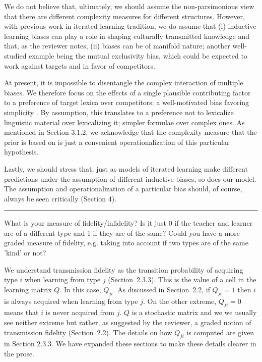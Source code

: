 \documentclass[12pt,a4paper]{article}
\begin{document}
We do not believe that, ultimately, we should assume the non-parsimonious view that there are different complexity measures for different structures. However, with previous work in iterated learning tradition, we do assume that (i) inductive learning biases can play a role in shaping culturally transmitted knowledge and that, as the reviewer notes, (ii) biases can be of manifold nature; another well-studied example being the mutual exclusivity bias, which could be expected to work against targets and in favor of competitors.

At present, it is impossible to disentangle the complex interaction of multiple biases. We therefore focus on the effects of a single plausible contributing factor to a preference of target lexica over competitors: a well-motivated bias favoring simplicity \citep{feldman:2000,chater+vitanyi:2003, piantadosi+etal:2012a,kirby+etal:2015,piantadosi+etal:underreview}. By assumption, this translates to a preference not to lexicalize linguistic material over lexicalizing it; simpler formulae over complex ones. As mentioned in Section 3.1.2, we acknowledge that the complexity measure that the prior is based on  is just a convenient operationalization of this particular hypothesis. 

Lastly, we should stress that, just as models of iterated learning make different predictions under the assumption of different inductive biases, so does our model. The assumption and operationalization of a particular bias should, of course, always be seen critically (Section 4). 

%

\vspace{0.5cm}
\noindent\rule{\textwidth}{1pt}

\begin{mdframed}[backgroundcolor=gray!25,linecolor=gray!25,frametitle= Reviewer \thereviewerCounter~comment \thereviewerCommentCounter \hfill ~~({\it transmission fidelity})]
%
What is your measure of fidelity/infidelity? Is it just 0 if the teacher and learner are of a different type and 1 if they are of the same? Could you have a more graded measure of fidelity, e.g. taking into account if two types are of the same 'kind' or not? 
\end{mdframed}
%
We understand transmission fidelity as the transition probability of acquiring type $i$ when learning from type $j$ (Section~2.3.3). This is the value of a cell in the learning matrix $Q$. In this case, $Q_{ji}$. As discussed in Section~2.2, if $Q_{ji} = 1$ then $i$ is always acquired when learning from type $j$. On the other extreme, $Q_{ji} = 0$ means that $i$ is never acquired from $j$. $Q$ is a stochastic matrix and we we usually see neither extreme but rather, as suggested by the reviewer, a graded notion of transmission fidelity (Section~2.2). The details on how $Q_{ji}$ is computed are given in Section 2.3.3. We have expanded these sections to make these details clearer in the prose.
%
\end{document}
